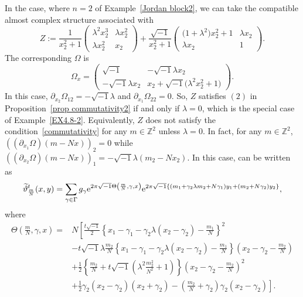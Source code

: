 \documentclass[10pt,a4paper]{amsart}
\numberwithin{equation}{section}
\newcommand{\Z}{\mathbb{Z}}
\renewcommand{\tilde}{\widetilde}
\begin{document}
\begin{Example}%
In the case, where $n=2$ of Example~\ref{Jordan block2}, we can take the compatible almost complex structure associated with
\[
Z:=\frac{1}{x_2^2+1}
\begin{pmatrix}
\lambda^2x_2^3 & \lambda x_2^2 \\
\lambda x_2^2 & x_2
\end{pmatrix}
+\dfrac{\sqrt{-1}}{x_2^2+1}
\begin{pmatrix}
\bigl(1+\lambda^2\bigr)x_2^2+1 & \lambda x_2 \\
\lambda x_2 & 1
\end{pmatrix}.
\]
The corresponding $\Omega$ is
\begin{equation*}
\Omega_x=
\begin{pmatrix}
\sqrt{-1} & -\sqrt{-1}\lambda x_2 \\
-\sqrt{-1}\lambda x_2 & x_2+\sqrt{-1}\bigl(\lambda^2x_2^2+1\bigr)
\end{pmatrix}.
\end{equation*}
In this case, $\partial_{x_2}\Omega_{12}=-\sqrt{-1}\lambda$ and $\partial_{x_1}\Omega_{22}=0$. So, $Z$ satisfies $(2)$ in Proposition~\ref{prop commutativity2} if and only if $\lambda=0$, which is the special case of Example~\ref{EX4.8-2}. Equivalently, $Z$
does not satisfy the condition~\eqref{commutativity} for any $m\in \Z^2$ unless $\lambda=0$. In fact, for any $m\in \Z^2$, $((\partial_{x_1}\Omega)(m-Nx))_2=0$ while $((\partial_{x_2}\Omega)(m-Nx))_1=-\sqrt{-1}\lambda (m_2-Nx_2)$. In this case, \smash{${\tilde \vartheta}_{\frac{m}{N}}^t$ }can be written as
\begin{align*}
{\tilde \vartheta}_{\frac{m}{N}}^t(x,y)=\sum_{\gamma \in \Gamma}g_\gamma {\rm e}^{2\pi\sqrt{-1}\Theta\left(\frac{m}{N}, \gamma, x\right)}{\rm e}^{2\pi\sqrt{-1}\left\{(m_1+\gamma_2\lambda m_2+N\gamma_1)y_1+(m_2+N\gamma_2)y_2\right\}},
\end{align*}
where
\begin{align*}
\Theta\left( \frac{m}{N},\gamma ,x\right)={}&
N\left[
\frac{t\sqrt{-1}}{2}\left\{x_1-\gamma_1-\gamma_2\lambda (x_2-\gamma_2)-\frac{m_1}{N}\right\}^2\right.\\
& \left. -t\sqrt{-1}\lambda \frac{m_2}{N}\left\{x_1-\gamma_1-\gamma_2\lambda (x_2-\gamma_2)-\frac{m_1}{N}\right\} \left( x_2-\gamma_2-\frac{m_2}{N}\right)\right.\\
& \left. +\frac{1}{2}\left\{ \frac{m_2}{N}+t\sqrt{-1}\left( \lambda^2\frac{m_2^2}{N^2}+1\right)\right\} \left( x_2-\gamma_2-\frac{m_2}{N}\right)^2\right.\\
&\left.+\frac{1}{2}\gamma_2 (x_2-\gamma_2)(x_2+\gamma_2)-\left(\frac{m_2}{N}+\gamma_2\right) \gamma_2(x_2-\gamma_2)\right].
\end{align*}
\end{Example}
\end{document}

